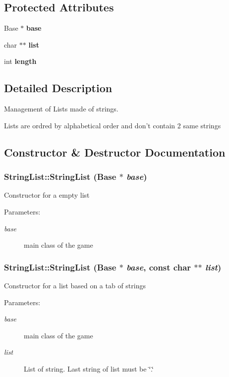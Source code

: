 \subsection*{Protected Attributes}
\begin{CompactItemize}
\item 
Base $\ast$ {\bf base}
\item 
char $\ast$$\ast$ {\bf list}
\item 
int {\bf length}
\end{CompactItemize}


\subsection{Detailed Description}
Management of Lists made of strings. 

Lists are ordred by alphabetical order and don't contain 2 same strings 

\subsection{Constructor \& Destructor Documentation}
\subsubsection{\setlength{\rightskip}{0pt plus 5cm}StringList::StringList (Base $\ast$ {\em base})}\label{classStringList_27f3450aa281ab6706add0ae491a8fd5}


Constructor for a empty list \begin{Desc}
\item[Parameters:]
\begin{description}
\item[{\em base}]main class of the game \end{description}
\end{Desc}
\subsubsection{\setlength{\rightskip}{0pt plus 5cm}StringList::StringList (Base $\ast$ {\em base}, const char $\ast$$\ast$ {\em list})}\label{classStringList_ec444aa29d2d78ce55bfe8af926aef6f}


Constructor for a list based on a tab of strings \begin{Desc}
\item[Parameters:]
\begin{description}
\item[{\em base}]main class of the game \item[{\em list}]List of string. Last string of list must be \char`\"{}.\char`\"{} \end{description}
\end{Desc}
